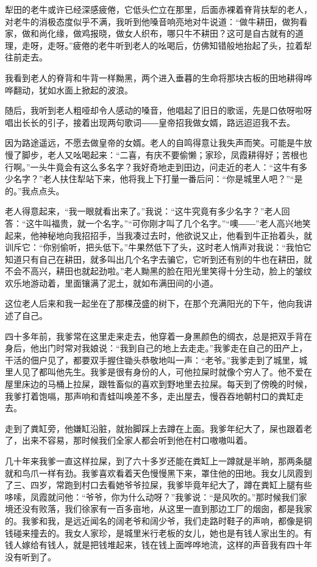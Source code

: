 \documentclass[12pt,UTF8]{ctexbook}
\begin{document}
犁田的老牛或许已经深感疲倦，它低头伫立在那里，后面赤裸着脊背扶犁的老人，对老牛的消极态度似乎不满，我听到他嗓音响亮地对牛说道：“做牛耕田，做狗看家，做和尚化缘，做鸡报晓，做女人织布，哪只牛不耕田？这可是自古就有的道理，走呀，走呀。”疲倦的老牛听到老人的吆喝后，仿佛知错般地抬起了头，拉着犁往前走去。

我看到老人的脊背和牛背一样黝黑，两个进入垂暮的生命将那块古板的田地耕得哗哗翻动，犹如水面上掀起的波浪。

随后，我听到老人粗哑却令人感动的嗓音，他唱起了旧日的歌谣，先是口依呀啦呀唱出长长的引子，接着出现两句歌词――皇帝招我做女婿，路远迢迢我不去。

因为路途遥远，不愿去做皇帝的女婿。老人的自鸣得意让我失声而笑。可能是牛放慢了脚步，老人又吆喝起来：“二喜，有庆不要偷懒；家珍，凤霞耕得好；苦根也行啊。”一头牛竟会有这么多名字？我好奇地走到田边，问走近的老人：“这牛有多少名字？”老人扶住犁站下来，他将我上下打量一番后问：“你是城里人吧？”“是的。”我点点头。

老人得意起来，“我一眼就看出来了。”我说：“这牛究竟有多少名字？”老人回答：“这牛叫福贵，就一个名字。”“可你刚才叫了几个名字。”“噢――”老人高兴地笑起来，他神秘地向我招招手，当我凑过去时，他欲说又止，他看到牛正抬着头，就训斥它：“你别偷听，把头低下。”牛果然低下了头，这时老人悄声对我说：“我怕它知道只有自己在耕田，就多叫出几个名字去骗它，它听到还有别的牛也在耕田，就不会不高兴，耕田也就起劲啦。”老人黝黑的脸在阳光里笑得十分生动，脸上的皱纹欢乐地游动着，里面镶满了泥土，就如布满田间的小道。

这位老人后来和我一起坐在了那棵茂盛的树下，在那个充满阳光的下午，他向我讲述了自己。

四十多年前，我爹常在这里走来走去，他穿着一身黑颜色的绸衣，总是把双手背在身后，他出门时常对我娘说：“我到自己的地上去走走。”我爹走在自己的田产上，干活的佃户见了，都要双手握住锄头恭敬地叫一声：“老爷。”我爹走到了城里，城里人见了都叫他先生。我爹是很有身份的人，可他拉屎时就像个穷人了。他不爱在屋里床边的马桶上拉屎，跟牲畜似的喜欢到野地里去拉屎。每天到了傍晚的时候，我爹打着饱嗝，那声响和青蛙叫唤差不多，走出屋去，慢吞吞地朝村口的粪缸走去。

走到了粪缸旁，他嫌缸沿脏，就抬脚踩上去蹲在上面。我爹年纪大了，屎也跟着老了，出来不容易，那时候我们全家人都会听到他在村口嗷嗷叫着。

几十年来我爹一直这样拉屎，到了六十多岁还能在粪缸上一蹲就是半晌，那两条腿就和鸟爪一样有劲。我爹喜欢看着天色慢慢黑下来，罩住他的田地。我女儿凤霞到了三、四岁，常跑到村口去看她爷爷拉屎，我爹毕竟年纪大了，蹲在粪缸上腿有些哆嗦，凤霞就问他：“爷爷，你为什么动呀？”我爹说：“是风吹的。”那时候我们家境还没有败落，我们徐家有一百多亩地，从这里一直到那边工厂的烟囱，都是我家的。我爹和我，是远近闻名的阔老爷和阔少爷，我们走路时鞋子的声响，都像是铜钱碰来撞去的。我女人家珍，是城里米行老板的女儿，她也是有钱人家出生的。有钱人嫁给有钱人，就是把钱堆起来，钱在钱上面哗哗地流，这样的声音我有四十年没有听到了。
\end{document}
